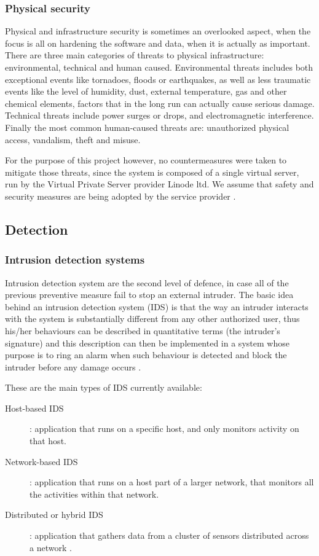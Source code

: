 \subsubsection{Physical security}
Physical and infrastructure security is sometimes an overlooked aspect, when the
focus is all on hardening the software and data, when it is actually as
important. There are three main categories of threats to physical
infrastructure: environmental, technical and human caused. Environmental threats
includes both exceptional events like tornadoes, floods or earthquakes, as well
as less traumatic events like the level of humidity, dust, external temperature, gas
and other chemical elements, factors that in the long run can actually cause
serious damage. Technical threats include power surges or drops, and
electromagnetic interference. Finally the most common human-caused threats are:
unauthorized physical access, vandalism, theft and misuse.

For the purpose of this project however, no countermeasures were taken to
mitigate those threats, since the system is composed of a single virtual server,
run by the Virtual Private Server provider Linode ltd. We assume that safety and
security measures are being adopted by the service provider \cite{WS15}.

\subsection{Detection}

\subsubsection{Intrusion detection systems}
Intrusion detection system are the second level of defence, in case all
of the previous preventive measure fail to stop an external intruder. The basic
idea behind an intrusion detection system (IDS) is that the way an intruder
interacts with the system is substantially different from any other authorized
user, thus his/her behaviours can be described in quantitative terms (the
intruder's signature) and this description can then be implemented in a system
whose purpose is to ring an alarm when such behaviour is detected and block the
intruder before any damage occurs \cite{WS15}.

These are the main types of IDS currently available:
\begin{description}
  \item[Host-based IDS]: application that runs on a specific host, and only
  monitors activity on that host.
  \item[Network-based IDS]: application that runs on a host part of a larger
  network, that monitors all the activities within that network.
  \item[Distributed or hybrid IDS]: application that gathers data from a
  cluster of sensors distributed across a network \cite{RS00}.
\end{description}


